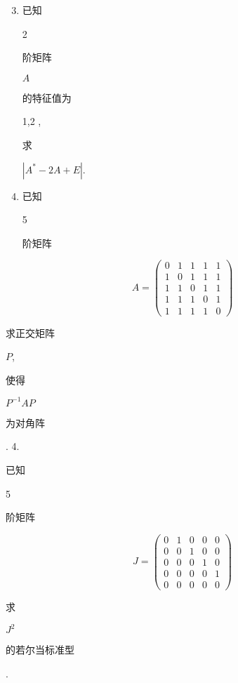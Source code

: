 \documentclass[10pt]{article}
\begin{document}
\begin{enumerate}
  \setcounter{enumi}{2}
  \item \begin{CJK}{UTF8}{mj}已知\end{CJK} 2 \begin{CJK}{UTF8}{mj}阶矩阵\end{CJK} $A$ \begin{CJK}{UTF8}{mj}的特征值为\end{CJK} 1,2 , \begin{CJK}{UTF8}{mj}求\end{CJK} $\left|A^{*}-2 A+E\right|$.

  \item \begin{CJK}{UTF8}{mj}已知\end{CJK} 5 \begin{CJK}{UTF8}{mj}阶矩阵\end{CJK}

\end{enumerate}
$$
A=\left(\begin{array}{lllll}
0 & 1 & 1 & 1 & 1 \\
1 & 0 & 1 & 1 & 1 \\
1 & 1 & 0 & 1 & 1 \\
1 & 1 & 1 & 0 & 1 \\
1 & 1 & 1 & 1 & 0
\end{array}\right)
$$
\begin{CJK}{UTF8}{mj}求正交矩阵\end{CJK} $P$, \begin{CJK}{UTF8}{mj}使得\end{CJK} $P^{-1} A P$ \begin{CJK}{UTF8}{mj}为对角阵\end{CJK}. 4. \begin{CJK}{UTF8}{mj}已知\end{CJK} 5 \begin{CJK}{UTF8}{mj}阶矩阵\end{CJK}
$$
J=\left(\begin{array}{lllll}
0 & 1 & 0 & 0 & 0 \\
0 & 0 & 1 & 0 & 0 \\
0 & 0 & 0 & 1 & 0 \\
0 & 0 & 0 & 0 & 1 \\
0 & 0 & 0 & 0 & 0
\end{array}\right)
$$
\begin{CJK}{UTF8}{mj}求\end{CJK} $J^{2}$ \begin{CJK}{UTF8}{mj}的若尔当标准型\end{CJK}.
\end{document}
